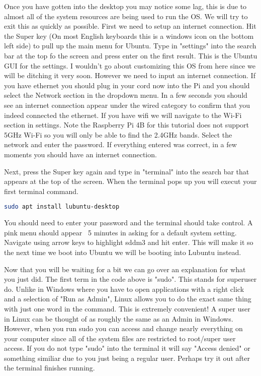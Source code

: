 \documentclass[letterpaper,12pt,notitlepage]{report} %
\begin{document}
Once you have gotten into the desktop you may notice some lag, this is due to almost all of the system resources are being used to run the OS. We will try to exit this as quickly as possible. First we need to setup an internet connection. Hit the Super key (On most English keyboards this is a windows icon on the bottom left side) to pull up the main menu for Ubuntu. Type in "settings" into the search bar at the top fo the screen and press enter on the first result. This is the Ubuntu GUI for the settings. I wouldn't go about customizing this OS from here since we will be ditching it very soon. However we need to input an internet connection. If you have ethernet you should plug in your cord now into the Pi and you should select the Network section in the dropdown menu. In a few seconds you should see an internet connection appear under the wired category to confirm that you indeed connected the ethernet. If you have wifi we will navigate to the Wi-Fi section in settings. Note the Raspberry Pi 4B for this tutorial does not support 5GHz Wi-Fi so you will only be able to find the 2.4GHz bands. Select the network and enter the password. If everything entered was correct, in a few moments you should have an internet connection.

Next, press the Super key again and type in "terminal" into the search bar that appears at the top of the screen. When the terminal pops up you will execut your first terminal command. 

\begin{lstlisting}[language=bash]
	sudo apt install lubuntu-desktop
\end{lstlisting}

You should need to enter your password and the terminal should take control. A pink menu should appear ~5 minutes in asking for a default system setting. Navigate using arrow keys to highlight sddm3 and hit enter. This will make it so the next time we boot into Ubuntu we will be booting into Lubuntu instead. 

Now that you will be waiting for a bit we can go over an explanation for what you just did. The first term in the code above is "sudo". This stands for superuser do. Unlike in Windows where you have to open applications with a right click and a selection of "Run as Admin", Linux allows you to do the exact same thing with just one word in the command. This is extremely convenient! A super user in Linux can be thought of as roughly the same as an Admin in Windows. However, when you run sudo you can access and change nearly everything on your computer since all of the system files are restricted to root/super user access. If you do not type "sudo" into the terminal it will say "Access denied" or something similiar due to you just being a regular user. Perhaps try it out after the terminal finishes running.
\end{document}
